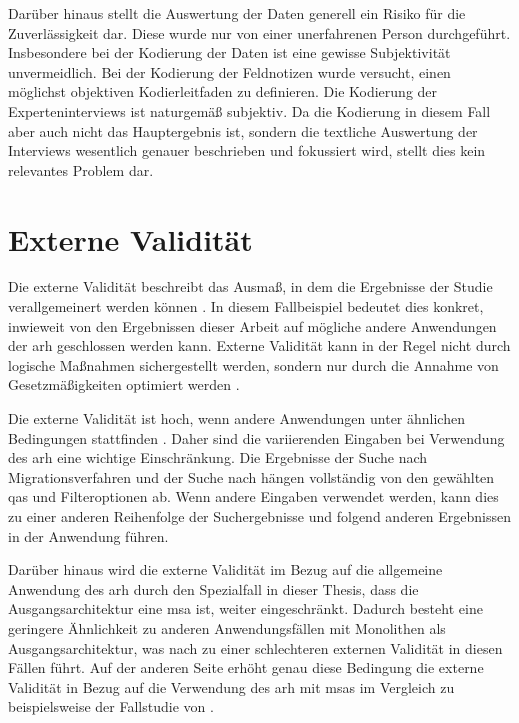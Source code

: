 Darüber hinaus stellt die Auswertung der Daten generell ein Risiko für die Zuverlässigkeit dar.
Diese wurde nur von einer unerfahrenen Person durchgeführt.
Insbesondere bei der Kodierung der Daten ist eine gewisse Subjektivität unvermeidlich.
Bei der Kodierung der Feldnotizen wurde versucht, einen möglichst objektiven Kodierleitfaden zu definieren.
Die Kodierung der Experteninterviews ist naturgemäß subjektiv.
Da die Kodierung in diesem Fall aber auch nicht das Hauptergebnis ist, sondern die textliche Auswertung der Interviews wesentlich genauer beschrieben und fokussiert wird, stellt dies kein relevantes Problem dar.

\section{Externe Validität}

Die externe Validität beschreibt das Ausmaß, in dem die Ergebnisse der Studie verallgemeinert werden können \cite{Runeson2009}.
In diesem Fallbeispiel bedeutet dies konkret, inwieweit von den Ergebnissen dieser Arbeit auf mögliche andere Anwendungen der \gls{arh} geschlossen werden kann.
Externe Validität kann in der Regel nicht durch logische Maßnahmen sichergestellt werden, sondern nur durch die Annahme von Gesetzmäßigkeiten optimiert werden \cite{campbell2015experimental}.

Die externe Validität ist hoch, wenn andere Anwendungen unter ähnlichen Bedingungen statt\-fin\-den \cite{campbell2015experimental}.
Daher sind die variierenden Eingaben bei Verwendung des \gls{arh} eine wichtige Einschränkung.
Die Ergebnisse der Suche nach Migrationsverfahren und der Suche nach \bpp hängen vollständig von den gewählten \glspl{qa} und Filteroptionen ab.
Wenn andere Eingaben verwendet werden, kann dies zu einer anderen Reihenfolge der Suchergebnisse und folgend anderen Ergebnissen in der Anwendung führen.

Darüber hinaus wird die externe Validität im Bezug auf die allgemeine Anwendung des \gls{arh} durch den Spezialfall in dieser Thesis, dass die Ausgangsarchitektur eine \gls{msa} ist, weiter eingeschränkt.
Dadurch besteht eine geringere Ähnlichkeit zu anderen Anwendungsfällen mit Monolithen als Ausgangsarchitektur, was nach  zu einer schlechteren externen Validität in diesen Fällen führt.
Auf der anderen Seite erhöht genau diese Bedingung die externe Validität in Bezug auf die Verwendung des \gls{arh} mit \glspl{msa} im Vergleich zu beispielsweise der Fallstudie von .

